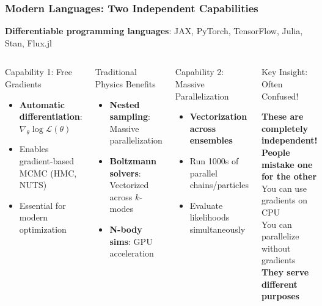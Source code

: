 \documentclass[aspectratio=169]{beamer}
\begin{document}
\begin{frame}
    \frametitle{Modern Languages: Two Independent Capabilities}
    \begin{center}
        \textbf{Differentiable programming languages}: JAX, PyTorch, TensorFlow, Julia, Stan, Flux.jl
    \end{center}
    \vspace{-5pt}
    \begin{columns}
        \begin{block}{Capability 1: Free Gradients}
            \begin{itemize}
                \item \textbf{Automatic differentiation}: $\nabla_\theta \log \mathcal{L}(\theta)$
                \item Enables gradient-based MCMC (HMC, NUTS)
                \item Essential for modern optimization
            \end{itemize}
        \end{block}
        \begin{block}{Traditional Physics Benefits}
            \begin{itemize}
                \item \textbf{Nested sampling}: Massive parallelization
                \item \textbf{Boltzmann solvers}: Vectorized across $k$-modes
                \item \textbf{N-body sims}: GPU acceleration
            \end{itemize}
        \end{block}
        \begin{block}{Capability 2: Massive Parallelization}
            \begin{itemize}
                \item \textbf{Vectorization across ensembles}
                \item Run 1000s of parallel chains/particles
                \item Evaluate likelihoods simultaneously
            \end{itemize}
        \end{block}
        \begin{block}{Key Insight: Often Confused!}
            \begin{center}
                \textbf{These are completely independent!}\\
                \textbf{People mistake one for the other}\\
                You can use gradients on CPU\\
                You can parallelize without gradients\\
                \textbf{They serve different purposes}
            \end{center}
        \end{block}
    \end{columns}
\end{frame}
\end{document}
